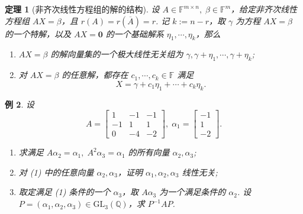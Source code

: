 \documentclass[10pt,openany]{article}
\theoremstyle{thmstyle} %
\newtheorem{theorem}{定理}[subsection]
\theoremstyle{defstyle} %
\theoremstyle{prostyle} %
\theoremstyle{exastyle}
\newtheorem{example}[theorem]{例}
\theoremstyle{remstyle}
\newcommand{\F}{\mathbb{F}}
\newcommand{\mn}{^{m \times n}}
\begin{document}
\begin{theorem}[非齐次线性方程组的解的结构] \label{5.3.3}
	设 \( A \in \F\mn, \; \beta \in \F^m \)，给定非齐次线性方程组 \( AX=\beta \)，且 \( r(A)=r(\overline{A})=r \). 记 \( k:=n-r \)，取 \( \gamma \) 为方程 \( AX=\beta \) 的一个特解，以及 \( AX=\bm{0} \) 的一个基础解系  \( \eta_1,\cdots,\eta_k \)，那么
	\begin{enumerate}[(1)]
		\item \( AX=\beta \) 的解向量集的一个极大线性无关组为 \( \gamma, \gamma+\eta_1,\cdots,\gamma+\eta_k \);
		\item 对 \( AX=\beta \) 的任意解，都存在 \( c_1,\cdots,c_k \in \F \) 满足
		\[ X=\gamma+c_1\eta_1+\cdots+c_k\eta_k. \]
	\end{enumerate}
\end{theorem}


\begin{example} \label{5.3.4}
	设
	\[ A=\begin{bmatrix}
		1 & -1 & -1 \\
		-1 & 1 & 1 \\
		0 & -4 & -2
	\end{bmatrix}, \; \alpha_1=\begin{bmatrix}
	  -1 \\ 1 \\ -2
	\end{bmatrix}. \]
	\begin{enumerate}[(1)]
		\item 求满足 \( A\alpha_2=\alpha_1, \; A^2\alpha_3=\alpha_1 \) 的所有向量 \( \alpha_2,\alpha_3 \);
		\item 对 (1) 中的任意向量 \( \alpha_2,\alpha_3 \)，证明 \( \alpha_1,\alpha_2,\alpha_3 \) 线性无关;
		\item 取定满足 (1) 条件的一个 \( \alpha_3 \)，取 \( A\alpha_3 \) 为一个满足条件的 \( \alpha_2 \). 设 \( P=(\alpha_1,\alpha_2,\alpha_3) \in \text{GL}_3(\mathbb{Q}) \)，求 \( P^{-1}AP \).
	\end{enumerate}
\end{example}
\end{document}
